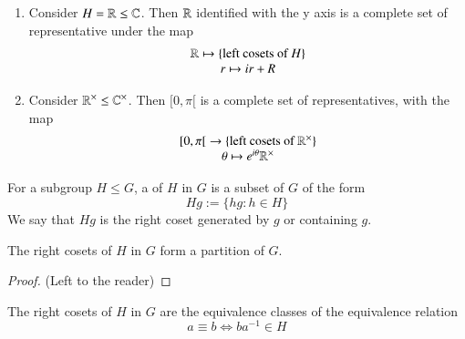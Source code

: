 \documentclass[12pt, a4paper, oneside, openright, titlepage]{book}
\begin{document}
\begin{eg}
\begin{enumerate}
\begin{center}
\begin{tikzpicture}[x=0.75pt,y=0.75pt,yscale=-1,xscale=1]
							\end{tikzpicture}
						\end{center}
				A complete set of representatives is $\R_{>0}$. Indeed, the map \begin{equation}
					\map{\R_{>0}\xrightarrow{f}\{\text{left cosets of $H$ in $\C^{\times}$}\}}{r\mapsto rH}
				\end{equation}
				Indeed, for all $x \in \C^{\times}$ $x = re^{i\theta}$ so $xH = re^{i\theta}H = rH$, as $e^{i\theta} \in H$, so $f$ is surjective. If $r,r' \in rH$ then $r' = rz$ with $|z| = 1$, so $|r'| = |rz| = |r|$. But, for $r,r' \in \R_{>0}$ $|r'| = |r|$ implies $r' = r$. Thus, $f$ is a bijection.
			\item Consider $H = \R\leq \C$. Then $\R$ identified with the y axis is a complete set of representative under the map \begin{equation}
				\map{\R\mapsto\{\text{left cosets of $H$}\}}{r\mapsto ir+R}
			\end{equation}
			\item Consider $\R^{\times} \leq \C^{\times}$. Then $[0,\pi[$ is a complete set of representatives, with the map \begin{equation}
				\map{{[0,\pi[}\rightarrow\{\text{left cosets of $\R^{\times}$}\}}{\theta \mapsto e^{i\theta}\R^{\times}}
			\end{equation}
		\end{enumerate}
\end{eg}

\begin{defn}
        For a subgroup $H \leq G$, a  of $H$ in $G$ is a subset of $G$ of the form \begin{equation}
                Hg := \{hg:h\in H\}
        \end{equation}
        We say that $Hg$ is the right coset generated by $g$ or containing $g$.
\end{defn}

\begin{thm}
        The right cosets of $H$ in $G$ form a partition of $G$.
\end{thm}
\begin{proof}
        (Left to the reader)
\end{proof}


\begin{rmk}
        The right cosets of $H$ in $G$ are the equivalence classes of the equivalence relation \begin{equation}
                a\equiv b \iff ba^{-1} \in H
        \end{equation}
\end{rmk}
\end{document}
